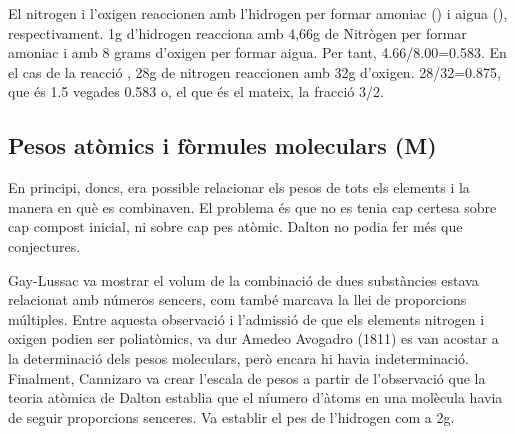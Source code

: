 El nitrogen i l'oxigen reaccionen amb l'hidrogen per formar amoniac () i aigua (), respectivament. 1g d'hidrogen reacciona amb 4,66g de Nitrògen per formar amoniac i amb 8 grams d'oxigen per formar aigua. Per tant, 4.66/8.00=0.583.
En el cas de la reacció , 28g de nitrogen reaccionen amb 32g d'oxigen. 28/32=0.875, que és 1.5 vegades 0.583 o, el que és el mateix, la fracció 3/2.



\subsection{Pesos atòmics i fòrmules moleculars (M)}

En principi, doncs, era possible relacionar els pesos de tots els elements i la manera en què es combinaven. El problema és que no es tenia cap certesa sobre cap compost inicial, ni sobre cap pes atòmic. Dalton no podia fer més que conjectures.

Gay-Lussac va mostrar el volum de la combinació de dues substàncies estava relacionat amb números sencers, com també marcava la llei de proporcions múltiples. Entre aquesta observació i l'admissió de que els elements nitrogen i oxigen podien ser poliatòmics, va dur Amedeo Avogadro (1811) es van acostar a la determinació dels pesos moleculars, però encara hi havia indeterminació. Finalment, Cannizaro va crear l'escala de pesos a partir de l'observació que la teoria atòmica de Dalton establia que el níumero d'àtoms en una molècula havia de seguir proporcions senceres. Va establir el pes de l'hidrogen com a 2g.

